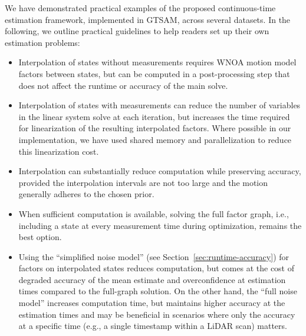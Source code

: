 We have demonstrated practical examples of the proposed continuous-time estimation framework, implemented in \ac{GTSAM}, across several datasets.
In the following, we outline practical guidelines to help readers set up their own estimation problems:

\begin{itemize}
  \item Interpolation of states without measurements requires \ac{WNOA} motion model factors between states, but can be computed in a post-processing step that does not affect the runtime or accuracy of the main solve. 
	\item Interpolation of states with measurements can reduce the number of variables in the linear system solve at each iteration, but increases the time required for linearization of the resulting interpolated factors. Where possible in our implementation, we have used shared memory and parallelization to reduce this linearization cost.
	\item Interpolation can substantially reduce computation while preserving accuracy, provided the interpolation intervals are not too large and the motion generally adheres to the chosen prior.
	\item When sufficient computation is available, solving the full factor graph, i.e., including a state at every measurement time during optimization, remains the best option.
	\item Using the ``simplified noise model'' (see Section~\ref{sec:runtime-accuracy}) for factors on interpolated states reduces computation, but comes at the cost of degraded accuracy of the mean estimate and overconfidence at estimation times compared to the full-graph solution. On the other hand, the ``full noise model'' increases computation time, but maintains higher accuracy at the estimation times and may be beneficial in scenarios where only the accuracy at a specific time (e.g., a single timestamp within a LiDAR scan) matters.
\end{itemize}
